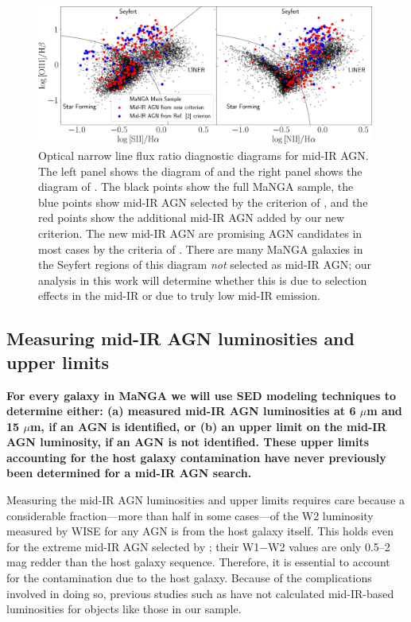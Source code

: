 \documentclass[12pt, preprint]{hacked-aastex}
\begin{document}
\begin{figure}[t!]
\includegraphics[width=0.99\textwidth]{bpt-agn.png}
    \caption{
      \label{fig:bpt} \small Optical narrow line flux ratio diagnostic diagrams
      for mid-IR AGN. The left panel shows the diagram of
      \cite{veilleux87a} and the right panel shows the diagram of
      \cite{baldwin81a}. The black points show the full MaNGA sample,
      the blue points show mid-IR AGN selected by the criterion of
      \cite{assef18a}, and the red points show the additional mid-IR
      AGN added by our new criterion. The new mid-IR AGN are promising
      AGN candidates in most cases by the criteria of
      \cite{baldwin81a}. There are many MaNGA galaxies in the Seyfert
      regions of this diagram {\it not} selected as mid-IR AGN; our
      analysis in this work will determine whether this is due to 
      selection effects in the mid-IR or due to truly low mid-IR
      emission. }
\end{figure}

\subsection{Measuring mid-IR AGN luminosities and upper limits}
\label{sec:measurements}

{\bf For every galaxy in MaNGA we will use SED modeling techniques to
  determine either: (a) measured mid-IR AGN luminosities at 6 $\mu$m
  and 15 $\mu$m, if an AGN is identified, or (b) an upper limit on the
  mid-IR AGN luminosity, if an AGN is not identified.  These upper
  limits accounting for the host galaxy contamination have never
  previously been determined for a mid-IR AGN search.}

Measuring the mid-IR AGN luminosities and upper limits requires care
because a considerable fraction---more than half in some cases---of
the W2 luminosity measured by WISE for any AGN is from the host galaxy
itself.  This holds even for the extreme mid-IR AGN selected by
\cite{assef18a}; their W1$-$W2 values are only 0.5--2 mag redder than
the host galaxy sequence.  Therefore, it is essential to account for
the contamination due to the host galaxy. Because of the complications
involved in doing so, previous studies such as \cite{hviding22a}
have not calculated mid-IR-based luminosities for objects like those
in our sample.
\end{document}
